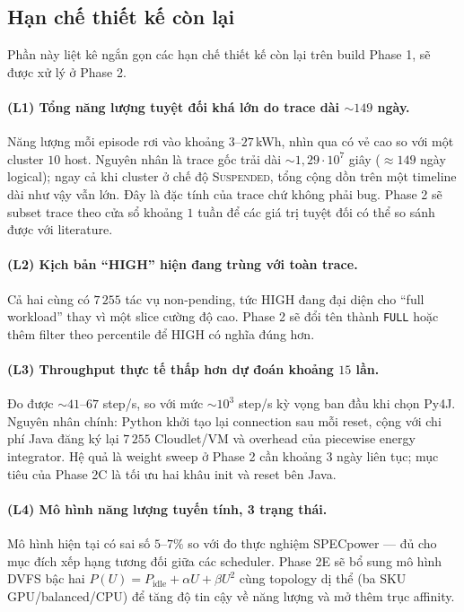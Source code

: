 \subsection{Hạn chế thiết kế còn lại}
\label{ssec:res-known-limits}

Phần này liệt kê ngắn gọn các hạn chế thiết kế còn lại trên build
Phase 1, sẽ được xử lý ở Phase 2.

\paragraph{(L1) Tổng năng lượng tuyệt đối khá lớn do trace dài $\sim 149$ ngày.}
Năng lượng mỗi episode rơi vào khoảng $3$--$27$\,kWh, nhìn qua có vẻ
cao so với một cluster $10$ host. Nguyên nhân là trace gốc trải dài
$\sim 1{,}29 \cdot 10^7$ giây ($\approx 149$ ngày logical); ngay cả
khi cluster ở chế độ \textsc{Suspended}, tổng cộng dồn trên một
timeline dài như vậy vẫn lớn. Đây là đặc tính của trace chứ không
phải bug. Phase 2 sẽ subset trace theo cửa sổ khoảng $1$ tuần để các
giá trị tuyệt đối có thể so sánh được với literature.

\paragraph{(L2) Kịch bản ``HIGH'' hiện đang trùng với toàn trace.}
Cả hai cùng có $7\,255$ tác vụ non-pending, tức HIGH đang đại diện
cho ``full workload'' thay vì một slice cường độ cao. Phase 2 sẽ đổi
tên thành \texttt{FULL} hoặc thêm filter theo percentile để HIGH có
nghĩa đúng hơn.

\paragraph{(L3) Throughput thực tế thấp hơn dự đoán khoảng $15$ lần.}
Đo được $\sim 41$--$67$ step/s, so với mức $\sim 10^3$ step/s kỳ
vọng ban đầu khi chọn Py4J. Nguyên nhân chính: Python khởi tạo lại
connection sau mỗi reset, cộng với chi phí Java đăng ký lại $7\,255$
Cloudlet/VM và overhead của piecewise energy integrator. Hệ quả là
weight sweep ở Phase 2 cần khoảng $3$ ngày liên tục; mục tiêu của
Phase 2C là tối ưu hai khâu init và reset bên Java.

\paragraph{(L4) Mô hình năng lượng tuyến tính, 3 trạng thái.}
Mô hình hiện tại có sai số $5$--$7\%$ so với đo thực nghiệm SPECpower
--- đủ cho mục đích xếp hạng tương đối giữa các scheduler. Phase 2E
sẽ bổ sung mô hình DVFS bậc hai $P(U) = P_{\mathrm{idle}} + \alpha U
+ \beta U^2$ cùng topology dị thể (ba SKU GPU/balanced/CPU) để tăng
độ tin cậy về năng lượng và mở thêm trục affinity.

